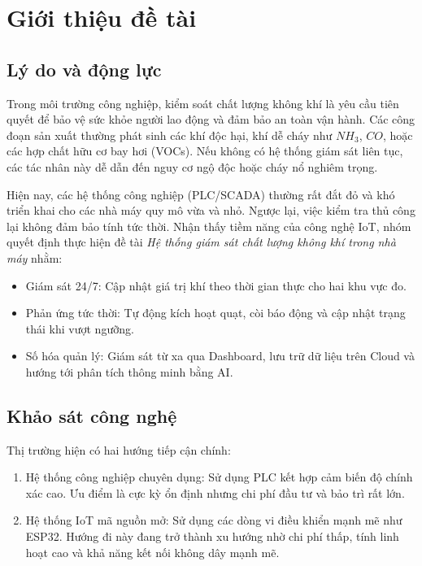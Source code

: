 \documentclass[../BTL_PTIT.tex]{subfiles}
\begin{document}
\section{Giới thiệu đề tài}

\subsection{Lý do và động lực}
Trong môi trường công nghiệp, kiểm soát chất lượng không khí là yêu cầu tiên quyết để bảo vệ sức khỏe người lao động và đảm bảo an toàn vận hành. Các công đoạn sản xuất thường phát sinh các khí độc hại, khí dễ cháy như $NH_3$, $CO$, hoặc các hợp chất hữu cơ bay hơi (VOCs). Nếu không có hệ thống giám sát liên tục, các tác nhân này dễ dẫn đến nguy cơ ngộ độc hoặc cháy nổ nghiêm trọng.

Hiện nay, các hệ thống công nghiệp (PLC/SCADA) thường rất đắt đỏ và khó triển khai cho các nhà máy quy mô vừa và nhỏ. Ngược lại, việc kiểm tra thủ công lại không đảm bảo tính tức thời. Nhận thấy tiềm năng của công nghệ IoT, nhóm quyết định thực hiện đề tài \textit{Hệ thống giám sát chất lượng không khí trong nhà máy} nhằm:

\begin{itemize}[label=\textbullet]
	\item Giám sát 24/7: Cập nhật giá trị khí theo thời gian thực cho hai khu vực đo.
	\item Phản ứng tức thời: Tự động kích hoạt quạt, còi báo động và cập nhật trạng thái khi vượt ngưỡng.
	\item Số hóa quản lý: Giám sát từ xa qua Dashboard, lưu trữ dữ liệu trên Cloud và hướng tới phân tích thông minh bằng AI.
\end{itemize}

\subsection{Khảo sát công nghệ}
Thị trường hiện có hai hướng tiếp cận chính:

\begin{enumerate}[label=\arabic*.]
	\item Hệ thống công nghiệp chuyên dụng: Sử dụng PLC kết hợp cảm biến độ chính xác cao. Ưu điểm là cực kỳ ổn định nhưng chi phí đầu tư và bảo trì rất lớn.
	\item Hệ thống IoT mã nguồn mở: Sử dụng các dòng vi điều khiển mạnh mẽ như ESP32. Hướng đi này đang trở thành xu hướng nhờ chi phí thấp, tính linh hoạt cao và khả năng kết nối không dây mạnh mẽ.
\end{enumerate}
\end{document}
